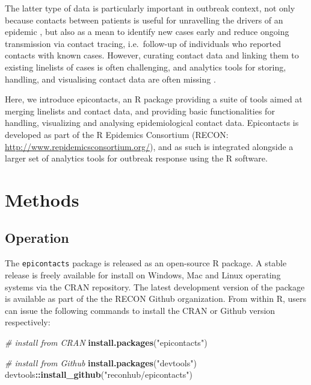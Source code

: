 \documentclass[9pt,a4paper,]{extarticle}
\newenvironment{Shaded}{\begin{snugshade}}{\end{snugshade}}
\newcommand{\KeywordTok}[1]{\textcolor[rgb]{0.13,0.29,0.53}{\textbf{#1}}}
\newcommand{\StringTok}[1]{\textcolor[rgb]{0.31,0.60,0.02}{#1}}
\newcommand{\CommentTok}[1]{\textcolor[rgb]{0.56,0.35,0.01}{\textit{#1}}}
\newcommand{\OperatorTok}[1]{\textcolor[rgb]{0.81,0.36,0.00}{\textbf{#1}}}
\newcommand{\NormalTok}[1]{#1}
\theoremstyle{definition}
\theoremstyle{definition}
\theoremstyle{definition}
\theoremstyle{remark}
\begin{document}
The latter type of data is particularly important in outbreak context, not only because contacts between patients is useful for unravelling the drivers of an epidemic \citep{agua-agum:2016}\citep{cauchemez:2016}, but also as a mean to identify new cases early and reduce ongoing transmission via contact tracing, i.e.~follow-up of individuals who reported contacts with known cases\citep{senga:2017}\citep{saurabh:2017}. However, curating contact data and linking them to existing linelists of cases is often challenging, and analytics tools for storing, handling, and visualising contact data are often missing \citep{who:2009}\citep{rakesh:2014}.

Here, we introduce epicontacts, an R package providing a suite of tools aimed at merging linelists and contact data, and providing basic functionalities for handling, visualizing and analysing epidemiological contact data. Epicontacts is developed as part of the R Epidemics Consortium (RECON: \url{http://www.repidemicsconsortium.org/}), and as such is integrated alongside a larger set of analytics tools for outbreak response using the R software\citep{rcore}.

\section{Methods}\label{methods}

\subsection{Operation}\label{operation}

The \texttt{epicontacts} package is released as an open-source R package. A stable release is freely available for install on Windows, Mac and Linux operating systems via the CRAN repository. The latest development version of the package is available as part of the the RECON Github organization. From within R, users can issue the following commands to install the CRAN or Github version respectively:

\begin{Shaded}
\begin{Highlighting}[]
\CommentTok{# install from CRAN}
\KeywordTok{install.packages}\NormalTok{(}\StringTok{"epicontacts"}\NormalTok{)}

\CommentTok{# install from Github}
\KeywordTok{install.packages}\NormalTok{(}\StringTok{"devtools"}\NormalTok{)}
\NormalTok{devtools}\OperatorTok{::}\KeywordTok{install_github}\NormalTok{(}\StringTok{"reconhub/epicontacts"}\NormalTok{)}
\end{Highlighting}
\end{Shaded}
\end{document}
